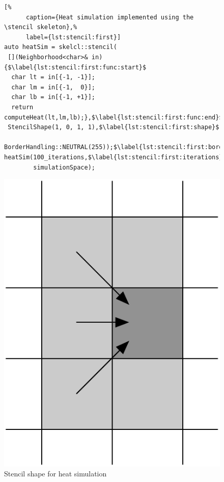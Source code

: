 \begin{figure}[t]
  \begin{minipage}[b]{.55\textwidth}
    \begin{lstlisting}[%
      caption={Heat simulation implemented using the \stencil skeleton},%
      label={lst:stencil:first}]
auto heatSim = skelcl::stencil(
 [](Neighborhood<char>& in) {$\label{lst:stencil:first:func:start}$
  char lt = in[{-1, -1}];
  char lm = in[{-1,  0}];
  char lb = in[{-1, +1}];
  return computeHeat(lt,lm,lb);},$\label{lst:stencil:first:func:end}$
 StencilShape(1, 0, 1, 1),$\label{lst:stencil:first:shape}$
 BorderHandling::NEUTRAL(255));$\label{lst:stencil:first:border}$
heatSim(100_iterations,$\label{lst:stencil:first:iterations}$
        simulationSpace);
    \end{lstlisting}
  \end{minipage}%
  \hfill%
  \begin{minipage}[b]{.38\textwidth}
    \centering
    \includegraphics[width=.65\textwidth]{Figures/HiStencils/heat_transfer}
    \caption{Stencil shape for heat simulation}
    \label{fig:stencil:first:shape}
  \end{minipage}
\end{figure}

